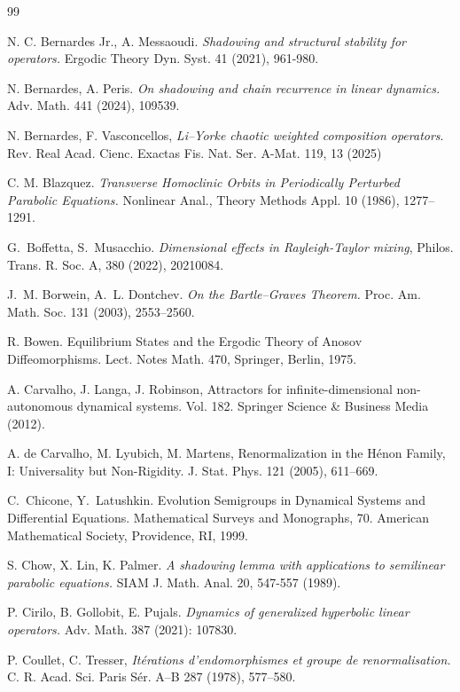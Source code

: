\documentclass[12pt]{article}
\theoremstyle{definition}
\begin{document}
\begin{thebibliography}{99}
{
N. C. Bernardes Jr., A. Messaoudi.
\textit{Shadowing and structural stability for operators.}
Ergodic Theory Dyn. Syst. 41 (2021), 961-980.

 N. Bernardes, A. Peris. \textit{On shadowing and chain recurrence in linear dynamics.} Adv. Math. 441 (2024), 109539.

N. Bernardes, F. Vasconcellos, \textit{Li–Yorke chaotic weighted composition operators}. Rev. Real Acad. Cienc. Exactas Fis. Nat. Ser. A-Mat. 119, 13 (2025)

C. M. Blazquez. 
\textit{Transverse Homoclinic Orbits in Periodically Perturbed Parabolic Equations.}
Nonlinear Anal., Theory Methods Appl. 10 (1986), 1277–1291.

G.~Boffetta, S.~Musacchio. {\em Dimensional effects in {Rayleigh-Taylor} mixing}, Philos. Trans. R. Soc. A, 380 (2022), 20210084.

J.~M. Borwein, A.~L. Dontchev.
\newblock \textit{On the Bartle--Graves Theorem.}
\newblock Proc. Am. Math. Soc. 131 (2003), 2553--2560.

R. Bowen. Equilibrium States and the Ergodic Theory of Anosov Diffeomorphisms.
Lect. Notes Math. 470, Springer, Berlin, 1975. 

A. Carvalho, J. Langa, J. Robinson, Attractors for infinite-dimensional non-autonomous dynamical systems. Vol. 182. Springer Science \& Business Media (2012).

A. de Carvalho, M. Lyubich, M. Martens, Renormalization in the Hénon Family, I: Universality but Non-Rigidity. J. Stat. Phys. 121 (2005), 611–669. 

C.~Chicone, Y.~Latushkin.
\newblock Evolution Semigroups in Dynamical Systems and Differential Equations.
\newblock Mathematical Surveys and Monographs, 70. American Mathematical Society, Providence, RI, 1999.

S. Chow, X. Lin,  K. Palmer. \textit{A shadowing lemma with applications to semilinear parabolic equations.} SIAM J. Math. Anal. 20, 547-557 (1989).

 P. Cirilo, B. Gollobit, E. Pujals. \textit{Dynamics of generalized hyperbolic linear operators.} Adv. Math. 387 (2021): 107830.

 P. Coullet, C. Tresser, \textit{Itérations d’endomorphismes et groupe de renormalisation.} C. R. Acad. Sci. Paris Sér. A–B 287 (1978), 577–580.

}
\end{thebibliography}
\end{document}
